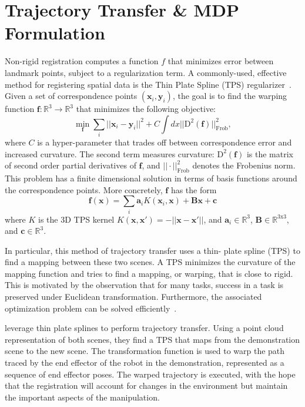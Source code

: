 \documentclass[conference]{IEEEtran}
\begin{document}
\section{Trajectory Transfer \& MDP Formulation}

Non-rigid registration computes a function $f$ that minimizes error
between landmark points, subject to a regularization term.  A
commonly-used, effective method for registering spatial data is the
Thin Plate Spline (TPS) regularizer~\citep{Carr_SIGGRAPH2001,
  Wahba_TPS1990}.  Given a set of correspondence points
$(\mathbf{x}_i, \mathbf{y}_i)$, the goal is to find the warping
function $\mathbf{f} : \mathbb{R}^3 \rightarrow \mathbb{R}^3$ that
minimizes the following objective:
$$\min_{\mathbf{f}} \sum_i ||\mathbf{x}_i - \mathbf{y}_i||^2 + C\int
dx ||\text{D}^2(\mathbf{f})||^2_{\text{Frob}},$$ where $C$ is a
hyper-parameter that trades off between correspondence error and
increased curvature.  The second term measures curvature:
$\text{D}^2(\mathbf{f})$ is the matrix of second order partial
derivatives of $\mathbf{f}$, and $||\cdot||^2_{\text{Frob}}$ denotes
the Frobenius norm.  This problem has a finite dimensional solution in
terms of basis functions around the correspondence points.  More
concretely, $\mathbf{f}$ has the form
$$\mathbf{f}(\mathbf{x}) = \sum_i \mathbf{a}_i K(\mathbf{x}_i, \mathbf{x}) + \mathbf{B}\mathbf{x} + \mathbf{c}$$
where $K$ is the 3D TPS kernel $K(\mathbf{x}, \mathbf{x}') = - ||\mathbf{x} - \mathbf{x}'||$, and $\mathbf{a}_i \in \mathbb{R}^3$, $\mathbf{B} \in \mathbb{R}^{3\text{x}3}$, and $\mathbf{c} \in \mathbb{R}^3$.


In particular, this method of trajectory transfer uses a thin- plate
spline (TPS) to find a mapping between these two scenes. A TPS
minimizes the curvature of the mapping function and tries to find a
mapping, or warping, that is close to rigid. This is motivated by the
observation that for many tasks, success in a task is preserved under
Euclidean transformation. Furthermore, the associated optimization
problem can be solved efficiently~\citep{Wahba_TPS1990}.

\citet{Schulmanetal_ISRR2013} leverage thin plate splines to perform
trajectory transfer.  Using a point cloud representation of both
scenes, they find a TPS that maps from the demonstration scene to the
new scene.  The transformation function is used to warp the path
traced by the end effector of the robot in the demonstration,
represented as a sequence of end effector poses. The warped trajectory
is executed, with the hope that the registration will account for
changes in the environment but maintain the important aspects of the
manipulation.
\end{document}

